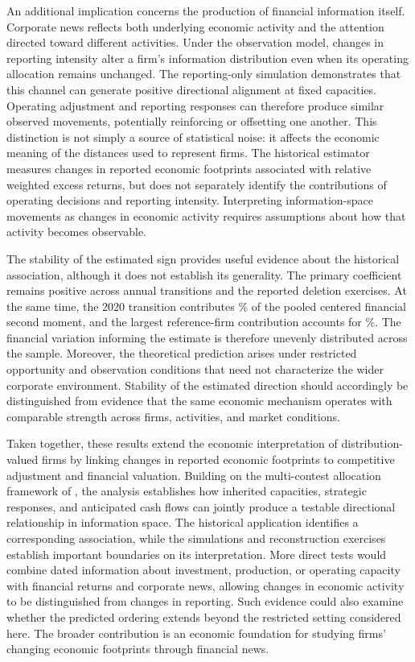 An additional implication concerns the production of financial information itself.
Corporate news reflects both underlying economic activity and the attention
directed toward different activities.
Under the observation model, changes in reporting intensity alter a firm's
information distribution even when its operating allocation remains unchanged.
The reporting-only simulation demonstrates that this channel can generate
positive directional alignment at fixed capacities.
Operating adjustment and reporting responses can therefore produce similar
observed movements, potentially reinforcing or offsetting one another.
This distinction is not simply a source of statistical noise: it affects the
economic meaning of the distances used to represent firms.
The historical estimator measures changes in reported economic footprints
associated with relative weighted excess returns, but does not separately identify the
contributions of operating decisions and reporting intensity.
Interpreting information-space movements as changes in economic activity
requires assumptions about how that activity becomes observable.

The stability of the estimated sign provides useful evidence about the
historical association, although it does not establish its generality.
The primary coefficient remains positive across annual transitions and the
reported deletion exercises.
At the same time, the 2020 transition contributes
\% of the pooled centered financial
second moment, and the largest reference-firm contribution accounts for
\%.
The financial variation informing the estimate is therefore unevenly
distributed across the sample.
Moreover, the theoretical prediction arises under restricted opportunity and
observation conditions that need not characterize the wider corporate environment.
Stability of the estimated direction should accordingly be distinguished from
evidence that the same economic mechanism operates with comparable strength
across firms, activities, and market conditions.

Taken together, these results extend the economic interpretation of
distribution-valued firms by linking changes in reported economic footprints to
competitive adjustment and financial valuation.
Building on the multi-contest allocation framework of
\citet{xu_zenou_zhou_conflict_2022}, the analysis establishes how inherited
capacities, strategic responses, and anticipated cash flows can jointly
produce a testable directional relationship in information space.
The historical application identifies a corresponding association, while the
simulations and reconstruction exercises establish important boundaries on
its interpretation.
More direct tests would combine dated information about investment,
production, or operating capacity with financial returns and corporate news,
allowing changes in economic activity to be distinguished from changes in reporting.
Such evidence could also examine whether the predicted ordering extends
beyond the restricted setting considered here.
The broader contribution is an economic foundation for studying firms'
changing economic footprints through financial news.
